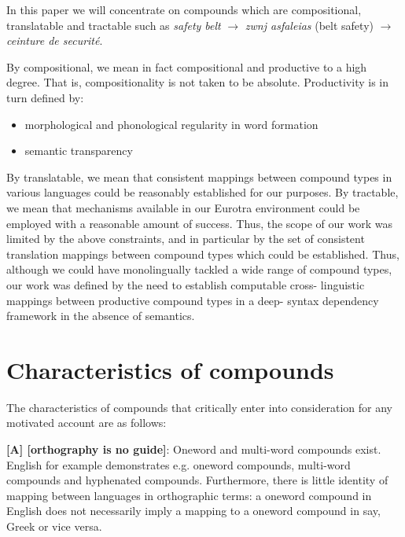 In  this  paper  we  will  concentrate  on  compounds  which  are 
compositional,   translatable and tractable such as {\it safety belt} 
$\rightarrow$
{\it zwnj asfaleias} (belt safety) $\rightarrow$ {\it ceinture de securit\'{e}}.

 By compositional, we 
mean in fact compositional and productive to a high degree.  That 
is, compositionality is not taken to be absolute. Productivity is 
in  turn defined by:

\begin{itemize}

\item morphological and phonological regularity in word formation
\item semantic transparency

\end{itemize}

By  translatable,   we  mean  that  consistent  mappings  between 
compound   types   in  various  languages  could  be   reasonably 
established  for  our purposes.   By tractable,   we   mean  that  
mechanisms  available  in  our  Eurotra  environment  could    be 
employed  with  a reasonable amount of  success.  Thus, the scope 
of  our  work  was  limited by  the  above  constraints,  and  in 
particular  by the set of consistent translation mappings between 
compound  types which could be  established.  Thus,  although  we 
could  have monolingually tackled a wide range of compound types, 
our  work was defined by the need to establish computable  cross-
linguistic mappings between productive compound types in a  deep-
syntax dependency framework in the absence of semantics.


\section{Characteristics of compounds}

The  characteristics  of  compounds that  critically  enter  into 
consideration  for  any  motivated account  are  as  follows: 

{\bf [A] [orthography is no guide]}:
Oneword  and  multi-word compounds  exist.  English  for  example 
demonstrates   e.g.   oneword  compounds,   multi-word  compounds  
and hyphenated  compounds.   
Furthermore,   there  is  little  identity  of  mapping   between 
languages  in orthographic terms:   a oneword compound in English 
does  not  necessarily imply a mapping to a oneword  compound  in 
say, Greek or vice versa. \\

